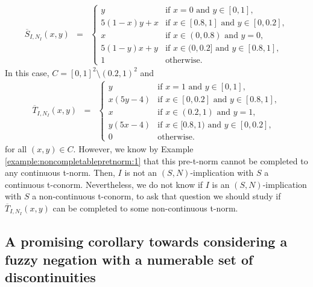 \begin{example}
\begin{eqnarray*}
	\overline{S}_{I,N_{I}}(x,y) 
	&=&
	\left\{ \begin{array}{ll}
		y &   \text{if }   x=0 \text{ and } y \in [0,1], \\
		5(1-x)y+x &   \text{if }   x \in [0.8,1] \text{ and } y \in [0,0.2], \\
		x &   \text{if }    x \in (0,0.8) \text{ and }  y=0, \\
		5(1-y)x+y &   \text{if }    x \in (0,0.2] \text{ and }  y\in [0.8,1], \\
		1 & \text{otherwise}.
	\end{array} \right.
\end{eqnarray*}
In this case, $C=[0,1]^2 \setminus (0.2,1)^2$ and 
\begin{eqnarray*}
	\overline{T}_{I,N_{I}}(x,y) 
	&=&
	\left\{ \begin{array}{ll}
		y &   \text{if }   x=1 \text{ and } y \in [0,1], \\
		x(5y-4) &   \text{if }   x \in [0,0.2] \text{ and } y \in [0.8,1], \\
		x &   \text{if }    x \in (0.2,1) \text{ and }  y=1, \\
		y(5x-4) &   \text{if }    x \in [0.8,1) \text{ and }  y\in [0,0.2], \\
		0 & \text{otherwise}.
	\end{array} \right.
\end{eqnarray*}
for all $(x,y) \in C$. However, we know by Example \ref{example:noncompletablepretnorm:1} that this pre-t-norm cannot be completed to any continuous t-norm. Then, $I$ is not an $(S,N)$-implication with $S$ a continuous t-conorm. Nevertheless, we do not know if $I$ is an $(S,N)$-implication with $S$ a non-continuous t-conorm, to ask that question we should study if $\overline{T}_{I,N_{I}}(x,y)$ can be completed to some non-continuous t-norm.
\end{example}

\subsection{A promising corollary towards considering a fuzzy negation with a numerable set of discontinuities}\label{subsection:sn:promisingresult}

